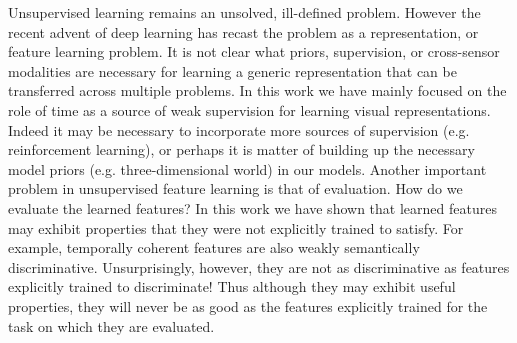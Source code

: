 Unsupervised learning remains an unsolved, ill-defined problem. However the recent 
advent of deep learning has recast the problem as a representation, or feature learning 
problem. It is not clear what priors, supervision, or cross-sensor modalities are necessary 
for learning a generic representation that can be transferred across multiple problems.
In this work we have mainly focused on the role of time as a source of weak supervision for 
learning visual representations. Indeed it may be necessary to incorporate more sources 
of supervision (e.g. reinforcement learning), or perhaps it is matter of building up the necessary 
model priors (e.g. three-dimensional world) in our models. Another important problem in 
unsupervised feature learning is that of evaluation. How do we evaluate the learned features? 
In this work we have shown that learned features may exhibit properties that they were not 
explicitly trained to satisfy. For example, temporally coherent features are also weakly 
semantically discriminative. Unsurprisingly, however, they are not as discriminative as 
features explicitly trained to discriminate! Thus although they may exhibit useful properties, 
they will never be as good as the features explicitly trained for the task on which they 
are evaluated.      
   
